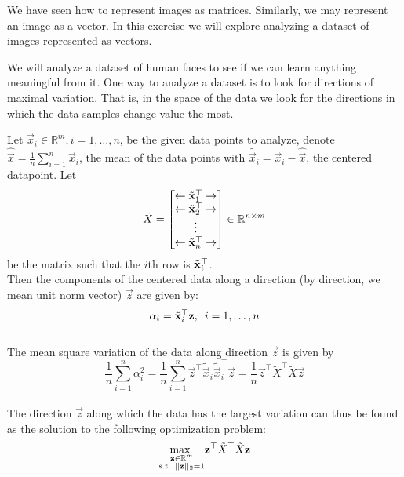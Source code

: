 
We have seen how to represent images as matrices. Similarly, we may represent an image as a vector. In this exercise we will explore analyzing a dataset of images represented as vectors. 

We will analyze a dataset of human faces to see if we can learn anything meaningful from it. One way to analyze a dataset is to look for directions of maximal variation. That is, in the space of the data we look for the directions in which the data samples change value the most.

Let $\vec{x}_i \in \mathbb{R}^m, i = 1, \hdots, n$, be the given data points to analyze, denote $\hat{\vec{x}} =  \frac{1}{n}\sum_{i =1}^{n} \vec{x}_i $, the mean of the data points with $ \tilde{\vec{x}_i} = \vec{x}_i - \hat{\vec{x}}$, the centered datapoint. Let 
\begin{equation*}
\Tilde{X} = 
\begin{bmatrix}
    \leftarrow \tilde{\vec{x}}_1^{\top} \rightarrow \\
    \leftarrow \tilde{\vec{x}}_2^{\top} \rightarrow \\
    \vdots       \\
    \leftarrow \tilde{\vec{x}}_n^{\top} \rightarrow
\end{bmatrix}
\in \mathbb{R}^{n \times m}
\end{equation*}
be the matrix such that the $i$th row is $\Tilde{\vec{x}}_i^{\top}$.
\\
Then the components of the centered data along a direction (by direction, we mean unit norm vector) $\vec{z}$ are given by:
\begin{equation*}
    \alpha_{i} = \Tilde{\vec{x}}_i^{\top}\vec{z}, \hspace{5pt} i = 1, \hdots, n
\end{equation*}
\\
The mean square variation of the data along direction $\vec{z}$ is given by 
\begin{equation*}
    \frac{1}{n} \sum_{i=1}^{n} \alpha_{i}^2 = \frac{1}{n}\sum_{i=1}^{n} \vec{z}^{\top}\tilde{\vec{x}}_{i}\tilde{\vec{x}}_{i}^{\top}\vec{z} = \frac{1}{n}\vec{z}^{\top}\tilde{X}^{\top}\tilde{X}\vec{z}
\end{equation*}
\\
The direction $\vec{z}$ along which the data has the largest variation can thus be found as the solution to the following optimization problem:
\begin{equation*}
    \underset{\begin{subarray}{c}
  \vec{z} \in \mathbb{R}^{m} \\
  \text{s.t. } ||\vec{z}||_2 = 1
  \end{subarray}}{\text{max }} \vec{z}^{\top}\tilde{X}^{\top}\tilde{X}\vec{z}
\end{equation*}

